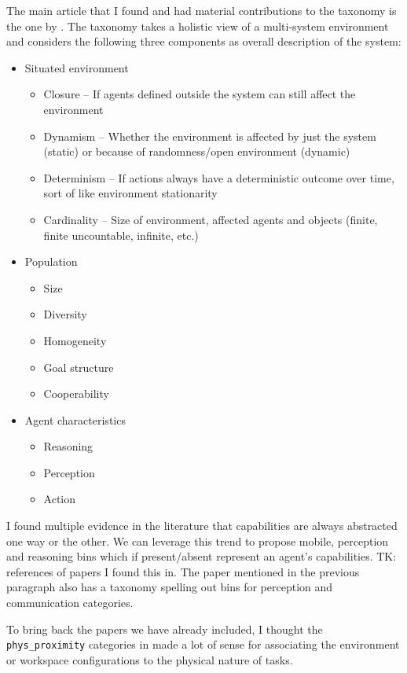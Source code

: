 \documentclass[letterpaper, 10 pt, conference]{ieeeconf} %
\begin{document}
The main article that I found and had material contributions to the taxonomy is the one by
\citet{moya2007towards}. The taxonomy takes a holistic view of a multi-system environment and
considers the following three components as overall description of the system:
\begin{itemize}{}
  \item Situated environment
    \begin{itemize}{}
      \item Closure -- If agents defined outside the system can still affect the environment
      \item Dynamism -- Whether the environment is affected by just the system (static) or because of
        randomness/open environment (dynamic)
      \item Determinism -- If actions always have a deterministic outcome over time, sort of like
        environment stationarity
      \item Cardinality -- Size of environment, affected agents and objects (finite, finite
        uncountable, infinite, etc.)
    \end{itemize}
  \item Population
    \begin{itemize}{}
      \item Size
      \item Diversity
      \item Homogeneity
      \item Goal structure
      \item Cooperability
    \end{itemize}
  \item Agent characteristics
    \begin{itemize}{}
      \item Reasoning
      \item Perception
      \item Action
    \end{itemize}
\end{itemize}

I found multiple evidence in the literature that capabilities are always abstracted one way or the
other. We can leverage this trend to propose mobile, perception and reasoning bins which if
present/absent represent an agent's capabilities. TK: references of papers I found this in. The
paper mentioned in the previous paragraph also has a taxonomy spelling out bins for perception and
communication categories.

To bring back the papers we have already included, I thought the \texttt{phys\_proximity} categories
in \citet{Yanco2004updated} made a lot of sense for associating the environment or workspace
configurations to the physical nature of tasks.
\end{document}
